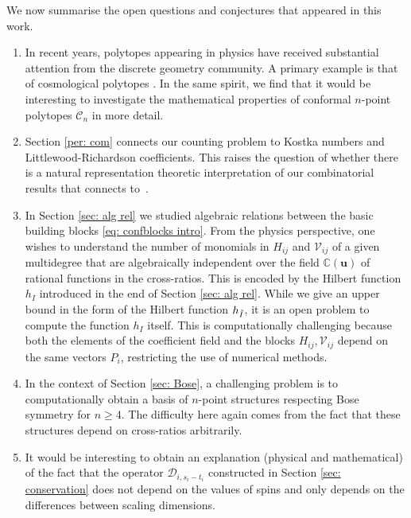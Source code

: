 \documentclass[12pt,a4paper]{extarticle}
\theoremstyle{definition}
\begin{document}
\medskip

We now summarise the open questions and conjectures that appeared in this work. 
\begin{enumerate}
    \item In recent years, polytopes appearing in physics have received substantial attention from the discrete geometry community. A primary example is that of cosmological polytopes \cite{cosmopolytopes}. In the same spirit, we find that it would be interesting to investigate the mathematical properties of conformal $n$-point polytopes $\mathcal{C}_n$ in more detail.

    \item Section \ref{per: com} connects our counting problem to Kostka numbers and Littlewood-Richardson coefficients. This raises the question of whether there is a natural representation theoretic interpretation of our combinatorial results that connects to~\cite{KSD}.

    \item In Section \ref{sec: alg rel} we studied algebraic relations between the basic building blocks \eqref{eq: confblocks intro}. From the physics perspective, one wishes to understand the number of monomials in $H_{ij}$ and $\mathcal{V}_{ij}$ of a given multidegree that are algebraically independent over the field $\mathbb{C}(\mathbf{u})$ of rational functions in the cross-ratios. This is encoded by the Hilbert function $h_I$ introduced in the end of Section \ref{sec: alg rel}. While we give an upper bound in the form of the Hilbert function $h_{\Tilde{I}}$, it is an open problem to compute the function $h_I$ itself. This is computationally challenging because both the elements of the coefficient field and the blocks $H_{ij}, \mathcal{V}_{ij}$ depend on the same vectors $P_i$, restricting the use of numerical methods.  

    \item In the context of Section \ref{sec: Bose}, a challenging problem is to computationally obtain a basis of $n$-point structures respecting Bose symmetry for $n\geq 4$. The difficulty here again comes from the fact that these structures depend on cross-ratios arbitrarily.

    \item It would be interesting to obtain an explanation (physical and mathematical) of the fact that the operator $\mathcal{D}_{i,s_i-t_i}$ constructed in Section \ref{sec: conservation} does not depend on the values of spins and only depends on the differences between scaling dimensions.


\end{enumerate}
\end{document}
